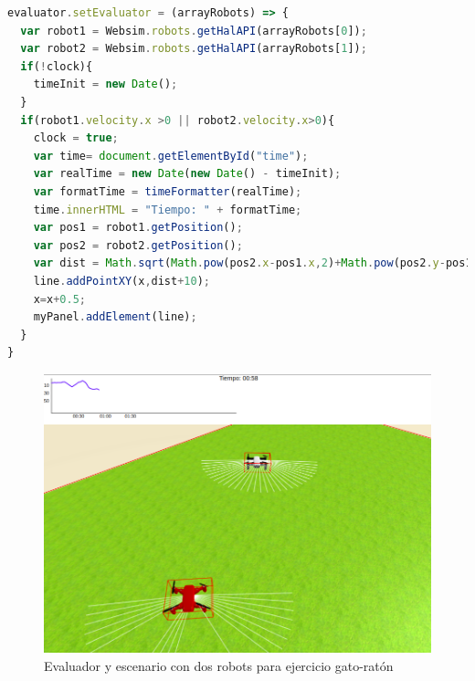 \begin{lstlisting}[language=javascript,caption={Código JavaScript que calcula la distancia entre \textit{drones}, la representa e incorpora un cronómetro al \textit{DOM}}]
evaluator.setEvaluator = (arrayRobots) => {
  var robot1 = Websim.robots.getHalAPI(arrayRobots[0]);
  var robot2 = Websim.robots.getHalAPI(arrayRobots[1]);
  if(!clock){
    timeInit = new Date();
  }
  if(robot1.velocity.x >0 || robot2.velocity.x>0){
    clock = true;
    var time= document.getElementById("time");
    var realTime = new Date(new Date() - timeInit);
    var formatTime = timeFormatter(realTime);
    time.innerHTML = "Tiempo: " + formatTime;
    var pos1 = robot1.getPosition();
    var pos2 = robot2.getPosition();
    var dist = Math.sqrt(Math.pow(pos2.x-pos1.x,2)+Math.pow(pos2.y-pos1.y,2)+Math.pow(pos2.z-pos1.z,2));
    line.addPointXY(x,dist+10);
    x=x+0.5;
    myPanel.addElement(line);
  }
}
\end{lstlisting}
\begin{figure}[ht]
\centering           
\includegraphics[scale=0.3]{img/evaluador_drone.png}
\caption{Evaluador y escenario con dos robots para ejercicio gato-ratón}
\label{fig:evaluador_gato_raton}
\end{figure}
